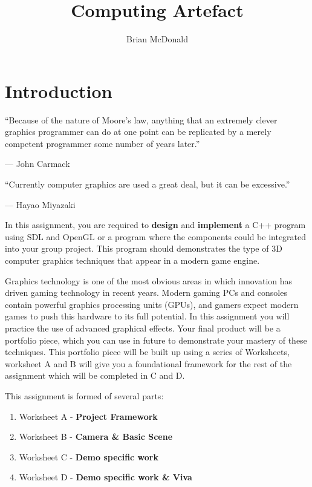 \documentclass{../../fal_assignment}
\title{Computing Artefact}
\author{Brian McDonald}
\begin{document}
\maketitle

\section*{Introduction}

\begin{marginquote}
``Because of the nature of Moore's law, anything that an extremely clever graphics programmer can do at one point can be replicated by a merely competent programmer some number of years later.''

--- John Carmack

    \marginquoterule

``Currently computer graphics are used a great deal, but it can be excessive.''

--- Hayao Miyazaki
\end{marginquote}

In this assignment, you are required to \textbf{design} and \textbf{implement} a C++ program using SDL and OpenGL or a program where the components could be integrated into your group project.
This program should demonstrates the type of 3D computer graphics techniques that appear in a modern game engine.

Graphics technology is one of the most obvious areas in which innovation has driven gaming technology in recent years.
Modern gaming PCs and consoles contain powerful graphics processing units (GPUs),
and gamers expect modern games to push this hardware to its full potential.
In this assignment you will practice the use of advanced graphical effects.
Your final product will be a portfolio piece, which you can use in future to demonstrate your mastery of these techniques. This portfolio piece will be built up using a series of Worksheets, worksheet A and B will give you a foundational framework for
the rest of the assignment which will be completed in C and D.

This assignment is formed of several parts:
\begin{enumerate}[label=(\Alph*)]
	\item Worksheet A - \textbf{Project Framework}
	\item Worksheet B - \textbf{Camera \& Basic Scene}
	\item Worksheet C - \textbf{Demo specific work}
	\item Worksheet D - \textbf{Demo specific work \& Viva}
\end{enumerate}
\end{document}
